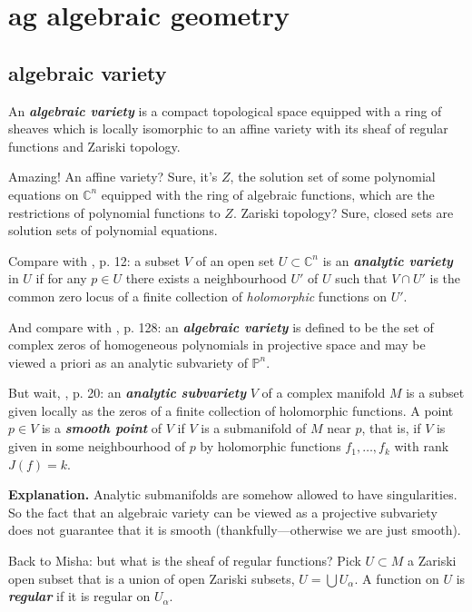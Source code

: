 \clearpage
\chapter{ag algebraic geometry}
\section{algebraic variety}

An \textit{\textbf{algebraic variety}} is a compact topological space equipped with a ring of sheaves which is locally isomorphic to an affine variety with its sheaf of regular functions and Zariski topology.

Amazing! An affine variety? Sure, it's \(Z\), the solution set of some polynomial equations on \(\mathbb{C}^n\) equipped with the ring of algebraic functions, which are the restrictions of polynomial functions to \(Z\). Zariski topology? Sure, closed sets are solution sets of polynomial equations.

Compare with \cite{gri}, p. 12: a subset \(V\) of an open set \(U \subset \mathbb{C}^n\) is an \textit{\textbf{analytic variety}} in \(U\) if for any \(p \in U\) there exists a neighbourhood \(U'\) of \(U\) such that \(V \cap U'\) is the common zero locus of a finite collection of \textit{holomorphic} functions on \(U'\).

And compare with \cite{gri}, p. 128: an \textit{\textbf{algebraic variety}} is defined to be the set of complex zeros of homogeneous polynomials in projective space and may be viewed a priori as an analytic subvariety of \(\mathbb{P}^n\).

But wait, \cite{gri}, p. 20: an \textit{\textbf{analytic subvariety}} \(V\) of a complex manifold \(M\) is a subset given locally as the zeros of a finite collection of holomorphic functions. A point \(p \in V\) is a \textit{\textbf{smooth point}} of \(V\) if \(V\) is a submanifold of \(M\) near \(p\), that is, if \(V\) is given in some neighbourhood of \(p\) by holomorphic functions \(f_1,\ldots,f_k\) with rank \(J(f)=k\).

\textbf{Explanation.} Analytic submanifolds are somehow allowed to have singularities. So the fact that an algebraic variety can be viewed as a projective subvariety does not guarantee that it is smooth (thankfully---otherwise we are just smooth).



Back to Misha: but what is the sheaf of regular functions? Pick \(U \subset M\) a Zariski open subset that is a union of open Zariski subsets, \(U=\bigcup U_\alpha\). A function on \(U\) is \textit{\textbf{regular}} if it is regular on \(U_\alpha\).

